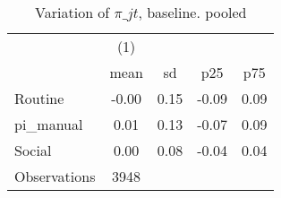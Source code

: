 \begin{table}[htbp]\centering
\def\sym#1{\ifmmode^{#1}\else\(^{#1}\)\fi}
\caption{Variation of $\pi\_{jt}$, baseline. pooled}
\begin{tabular}{l*{1}{cccc}}
\toprule
                    &\multicolumn{1}{c}{(1)}&            &            &            \\
                    &        mean&          sd&         p25&         p75\\
\midrule
Routine             &       -0.00&        0.15&       -0.09&        0.09\\
pi\_manual           &        0.01&        0.13&       -0.07&        0.09\\
Social              &        0.00&        0.08&       -0.04&        0.04\\
\midrule
Observations        &        3948&            &            &            \\
\bottomrule
\end{tabular}
\end{table}
